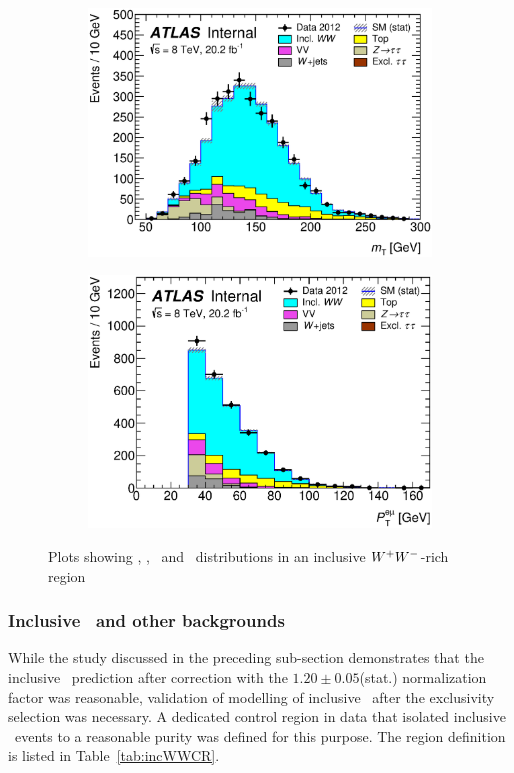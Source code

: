 \begin{figure}[!h]
\begin{subfigure}{0.5\textwidth}
   \includegraphics[width=\textwidth]{figures/emme-CutNjets-MT-lin.eps}
\end{subfigure} 
\begin{subfigure}{0.5\textwidth}
   \includegraphics[width=\textwidth]{figures/emme-CutNjets-Ptll-lin.eps}
\end{subfigure} 
\caption{Plots showing \memu, \dFem, \mT\ and \pTemu\ distributions in an inclusive $W^+W^-$-rich region}
\label{fig:incWWplots}
\end{figure}


\subsubsection{Inclusive \WW\ and other backgrounds}
\label{sec:incWW}
\par While the study discussed in the preceding sub-section demonstrates that the inclusive 
\WW\ prediction after correction with the $1.20 \pm 0.05$(stat.) normalization factor was reasonable, 
validation of modelling of inclusive \WW\ after the exclusivity selection was necessary. 
A dedicated control region in data that isolated inclusive \WW\ events to a reasonable 
purity was defined for this purpose. The region definition is listed in Table~\ref{tab:incWWCR}. 

